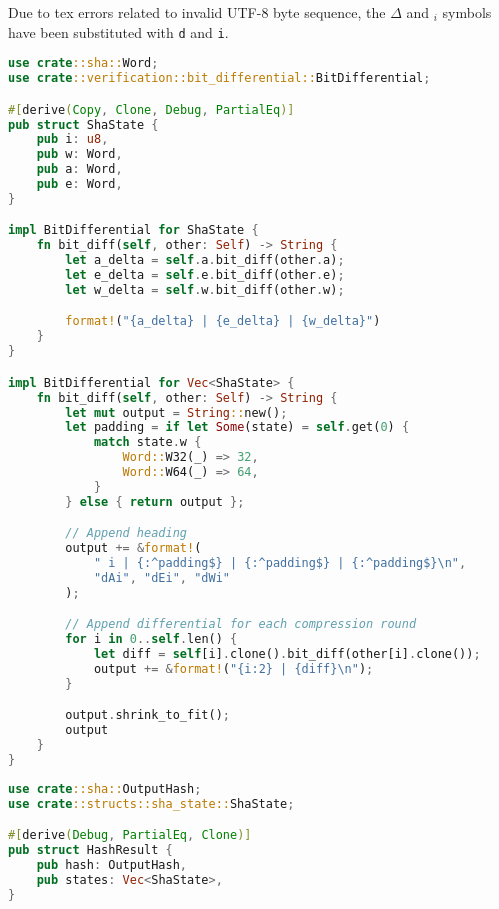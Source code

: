 Due to tex errors related to invalid UTF-8 byte sequence, the $\Delta$ and $_i$ symbols have been substituted with \texttt{d} and \texttt{i}.

\begin{lstlisting}[language=rust, caption={structs/sha\_state.rs}]
use crate::sha::Word;
use crate::verification::bit_differential::BitDifferential;

#[derive(Copy, Clone, Debug, PartialEq)]
pub struct ShaState {
	pub i: u8,
	pub w: Word,
	pub a: Word,
	pub e: Word,
}

impl BitDifferential for ShaState {
	fn bit_diff(self, other: Self) -> String {
		let a_delta = self.a.bit_diff(other.a);
		let e_delta = self.e.bit_diff(other.e);
		let w_delta = self.w.bit_diff(other.w);

		format!("{a_delta} | {e_delta} | {w_delta}")
	}
}

impl BitDifferential for Vec<ShaState> {
	fn bit_diff(self, other: Self) -> String {
		let mut output = String::new();
		let padding = if let Some(state) = self.get(0) {
			match state.w {
				Word::W32(_) => 32,
				Word::W64(_) => 64,
			}
		} else { return output };

		// Append heading
		output += &format!(
			" i | {:^padding$} | {:^padding$} | {:^padding$}\n",
			"dAi", "dEi", "dWi"
		);

		// Append differential for each compression round
		for i in 0..self.len() {
			let diff = self[i].clone().bit_diff(other[i].clone());
			output += &format!("{i:2} | {diff}\n");
		}

		output.shrink_to_fit();
		output
	}
}
\end{lstlisting}

\begin{lstlisting}[language=rust, caption={structs/hash\_result.rs}]
use crate::sha::OutputHash;
use crate::structs::sha_state::ShaState;

#[derive(Debug, PartialEq, Clone)]
pub struct HashResult {
	pub hash: OutputHash,
	pub states: Vec<ShaState>,
}
\end{lstlisting}

